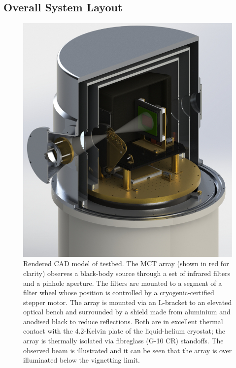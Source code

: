 \documentclass{spie}
\begin{document}
\subsection{Overall System Layout}\label{ssec:layout}
\begin{figure}[htb]
\begin{center}
\includegraphics[height=0.5\textheight]{MCT_cryostat_ISO}
\caption{Rendered CAD model of testbed. The MCT array (shown in red for clarity) observes a black-body source through a set of infrared filters and a pinhole aperture. The filters are mounted to a segment of a filter wheel whose position is controlled by a cryogenic-certified stepper motor. The array is mounted via an L-bracket to an elevated optical bench and surrounded by a shield made from aluminium and anodised black to reduce reflections. Both are in excellent thermal contact with the 4.2-Kelvin plate of the liquid-helium cryostat; the array is thermally isolated via fibreglass (G-10 CR) standoffs. The observed beam is illustrated and it can be seen that the array is over illuminated below the vignetting limit.}\label{fig:cryostatISO}
\end{center}
\end{figure}
\end{document}
